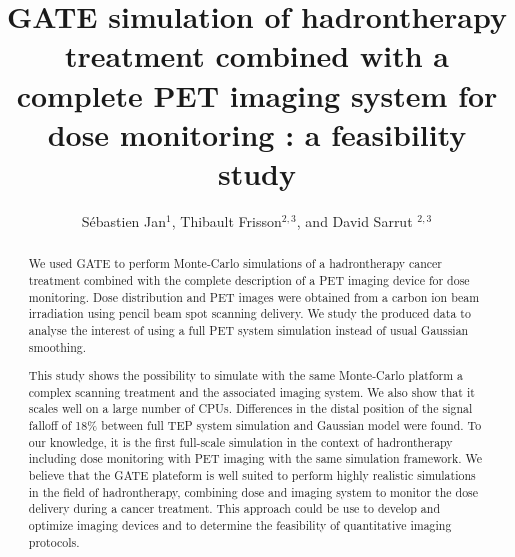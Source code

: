 \documentclass[11pt]{iopart}
\begin{document}
\title[Gate Hadron PET]{GATE simulation of hadrontherapy treatment
  combined with a complete PET imaging system for dose monitoring : a
  feasibility study}


\author{S{\'e}bastien Jan$^{1}$, Thibault Frisson$^{2,3}$, and David Sarrut $^{2,3}$}

\address{$^1$ CEA, Service Hospitalier Fr{\'e}d{\'e}ric Joliot, Orsay, France}
\address{$^2$ University of Lyon, CREATIS; CNRS UMR5220; INSA-Lyon, France}
\address{$^3$ University of Lyon, L\'eon B\'erard Cancer Center, F-69373, Lyon, France}

\linenumbers
\begin{abstract}

  {\it

    We used GATE to perform Monte-Carlo simulations of a hadrontherapy
    cancer treatment combined with the complete description of a PET
    imaging device for dose monitoring. Dose distribution and PET
    images were obtained from a carbon ion beam irradiation using
    pencil beam spot scanning delivery. We study the produced data
    to analyse the interest of using a full PET system simulation
    instead of usual Gaussian smoothing. 

    This study shows the possibility to simulate with the same
    Monte-Carlo platform a complex scanning treatment and the
    associated imaging system. We also show that it scales well on a
    large number of CPUs. Differences in the distal position of the
    signal falloff of 18\% between full TEP system simulation and
    Gaussian model were found.  To our knowledge, it is the first
    full-scale simulation in the context of hadrontherapy including
    dose monitoring with PET imaging with the same simulation
    framework. We believe that the GATE plateform is well suited to
    perform highly realistic simulations in the field of
    hadrontherapy, combining dose and imaging system to monitor the
    dose delivery during a cancer treatment. This approach could be
    use to develop and optimize imaging devices and to determine the
    feasibility of quantitative imaging protocols.
    
  }

  
\end{abstract}
\end{document}
